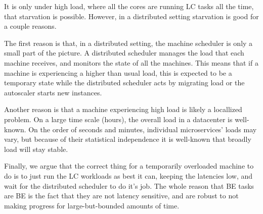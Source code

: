 It is only under high load, where all the cores are running LC tasks all the
time, that starvation is possible. However, in a distributed setting starvation
is good for a couple reasons.

The first reason is that, in a distributed setting, the machine scheduler is
only a small part of the picture. A distributed scheduler manages the load that
each machine receives, and monitors the state of all the machines. This means
that if a machine is experiencing a higher than usual load, this is expected to
be a temporary state while the distributed scheduler acts by migrating load or
the autoscaler starts new instances.

Another reason is that a machine experiencing high load is likely a locallized
problem. On a large time scale (hours), the overall load in a datacenter is
well-known. On the order of seconds and minutes, individual microservices' loads
may vary, but because of their statistical independence it is well-known that
broadly load will stay stable. 

Finally, we argue that the correct thing for a temporarily overloaded machine to
do is to just run the LC workloads as best it can, keeping the latencies low,
and wait for the distributed scheduler to do it's job. The whole reason that BE
tasks are BE is the fact that they are not latency sensitive, and are robust to
not making progress for large-but-bounded amounts of time.